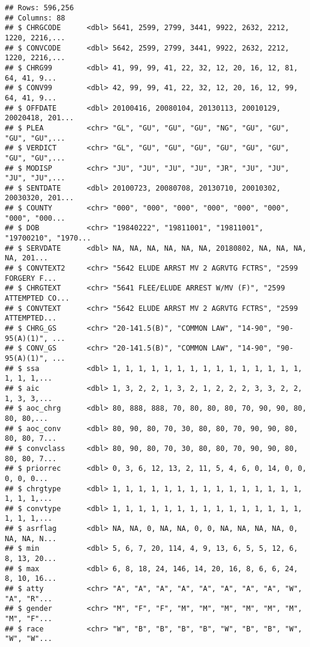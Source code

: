 \documentclass[
]{article}
\begin{document}
\begin{verbatim}
## Rows: 596,256
## Columns: 88
## $ CHRGCODE      <dbl> 5641, 2599, 2799, 3441, 9922, 2632, 2212, 1220, 2216,...
## $ CONVCODE      <dbl> 5642, 2599, 2799, 3441, 9922, 2632, 2212, 1220, 2216,...
## $ CHRG99        <dbl> 41, 99, 99, 41, 22, 32, 12, 20, 16, 12, 81, 64, 41, 9...
## $ CONV99        <dbl> 42, 99, 99, 41, 22, 32, 12, 20, 16, 12, 99, 64, 41, 9...
## $ OFFDATE       <dbl> 20100416, 20080104, 20130113, 20010129, 20020418, 201...
## $ PLEA          <chr> "GL", "GU", "GU", "GU", "NG", "GU", "GU", "GU", "GU",...
## $ VERDICT       <chr> "GL", "GU", "GU", "GU", "GU", "GU", "GU", "GU", "GU",...
## $ MODISP        <chr> "JU", "JU", "JU", "JU", "JR", "JU", "JU", "JU", "JU",...
## $ SENTDATE      <dbl> 20100723, 20080708, 20130710, 20010302, 20030320, 201...
## $ COUNTY        <chr> "000", "000", "000", "000", "000", "000", "000", "000...
## $ DOB           <chr> "19840222", "19811001", "19811001", "19700210", "1970...
## $ SERVDATE      <dbl> NA, NA, NA, NA, NA, NA, 20180802, NA, NA, NA, NA, 201...
## $ CONVTEXT2     <chr> "5642 ELUDE ARRST MV 2 AGRVTG FCTRS", "2599 FORGERY F...
## $ CHRGTEXT      <chr> "5641 FLEE/ELUDE ARREST W/MV (F)", "2599 ATTEMPTED CO...
## $ CONVTEXT      <chr> "5642 ELUDE ARRST MV 2 AGRVTG FCTRS", "2599 ATTEMPTED...
## $ CHRG_GS       <chr> "20-141.5(B)", "COMMON LAW", "14-90", "90-95(A)(1)", ...
## $ CONV_GS       <chr> "20-141.5(B)", "COMMON LAW", "14-90", "90-95(A)(1)", ...
## $ ssa           <dbl> 1, 1, 1, 1, 1, 1, 1, 1, 1, 1, 1, 1, 1, 1, 1, 1, 1, 1,...
## $ aic           <dbl> 1, 3, 2, 2, 1, 3, 2, 1, 2, 2, 2, 3, 3, 2, 2, 1, 3, 3,...
## $ aoc_chrg      <dbl> 80, 888, 888, 70, 80, 80, 80, 70, 90, 90, 80, 80, 80,...
## $ aoc_conv      <dbl> 80, 90, 80, 70, 30, 80, 80, 70, 90, 90, 80, 80, 80, 7...
## $ convclass     <dbl> 80, 90, 80, 70, 30, 80, 80, 70, 90, 90, 80, 80, 80, 7...
## $ priorrec      <dbl> 0, 3, 6, 12, 13, 2, 11, 5, 4, 6, 0, 14, 0, 0, 0, 0, 0...
## $ chrgtype      <dbl> 1, 1, 1, 1, 1, 1, 1, 1, 1, 1, 1, 1, 1, 1, 1, 1, 1, 1,...
## $ convtype      <dbl> 1, 1, 1, 1, 1, 1, 1, 1, 1, 1, 1, 1, 1, 1, 1, 1, 1, 1,...
## $ asrflag       <dbl> NA, NA, 0, NA, NA, 0, 0, NA, NA, NA, NA, 0, NA, NA, N...
## $ min           <dbl> 5, 6, 7, 20, 114, 4, 9, 13, 6, 5, 5, 12, 6, 8, 13, 20...
## $ max           <dbl> 6, 8, 18, 24, 146, 14, 20, 16, 8, 6, 6, 24, 8, 10, 16...
## $ atty          <chr> "A", "A", "A", "A", "A", "A", "A", "A", "W", "A", "R"...
## $ gender        <chr> "M", "F", "F", "M", "M", "M", "M", "M", "M", "M", "F"...
## $ race          <chr> "W", "B", "B", "B", "B", "W", "B", "B", "W", "W", "W"...

\end{verbatim}
\end{document}
